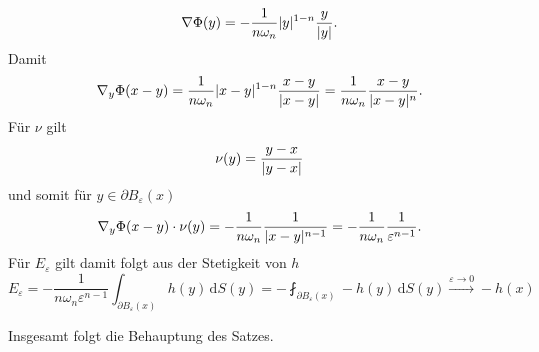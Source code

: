 \begin{beweis}
\begin{beweis}
\begin{enumerate}[(i)]
\begin{equation}
				 \nabla \Phi(y) = - \frac{1}{n \omega_n} \lvert y\rvert^{1-n} \frac{y}{\lvert y\rvert}.
			\end{equation}
			Damit
			\begin{equation}
				 \nabla_y \Phi(x-y) = \frac{1}{n \omega_n} \lvert x-y\rvert^{1-n} \frac{x-y}{\lvert x-y\rvert} = \frac{1}{n \omega_n} \frac{x-y}{\lvert x-y\rvert^n}.
			\end{equation}
			Für $\nu$ gilt
			\begin{equation}
				\nu(y) = \frac{y-x}{\lvert y-x\rvert}  
			\end{equation}
			und somit für $y \in \partial B_{\varepsilon}(x)$
			\begin{equation}
				 \nabla_y \Phi(x-y) \cdot \nu(y) = - \frac{1}{n \omega_n} \frac{1}{\lvert x-y\rvert^{n-1}} =- \frac{1}{n \omega_n} \frac{1}{\varepsilon^{n-1}}.
			\end{equation}
			Für $E_{\varepsilon}$ gilt damit folgt aus der Stetigkeit von $h$
			\begin{equation}
				E _{\varepsilon} = - \frac{1}{n \omega_n \varepsilon^{n-1}} \int_{\partial B_{\varepsilon}(x)}^{} h(y) \,\mathrm{d}S(y) 
				= - \fint_{\partial B_{\varepsilon}(x)}^{} -h(y) \,\mathrm{d}S(y) \stackrel{\varepsilon \to 0}{\to } -h(x)
			\end{equation}
		\end{enumerate}
	\end{beweis}
	Insgesamt folgt die Behauptung des Satzes.
\end{beweis}	

